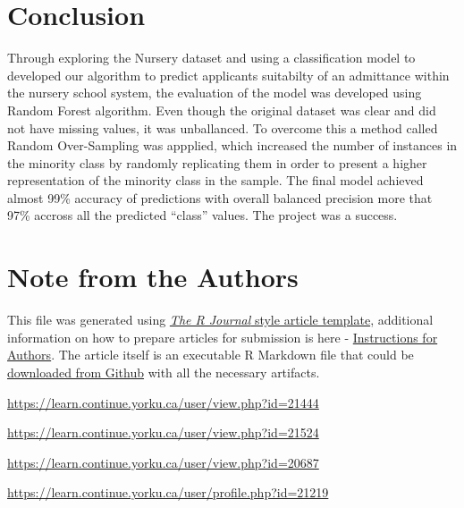 \newpage

\hypertarget{conclusion}{%
\section{Conclusion}\label{conclusion}}

Through exploring the Nursery dataset and using a classification model
to developed our algorithm to predict applicants suitabilty of an
admittance within the nursery school system, the evaluation of the model
was developed using Random Forest algorithm. Even though the original
dataset was clear and did not have missing values, it was unballanced.
To overcome this a method called Random Over-Sampling was appplied,
which increased the number of instances in the minority class by
randomly replicating them in order to present a higher representation of
the minority class in the sample. The final model achieved almost 99\%
accuracy of predictions with overall balanced precision more that 97\%
accross all the predicted ``class'' values. The project was a success.



\newpage

\hypertarget{note-from-the-authors}{%
\section{Note from the Authors}\label{note-from-the-authors}}

This file was generated using
\href{https://github.com/rstudio/rticles}{\emph{The R Journal} style
article template}, additional information on how to prepare articles for
submission is here -
\href{https://journal.r-project.org/share/author-guide.pdf}{Instructions
for Authors}. The article itself is an executable R Markdown file that
could be
\href{https://github.com/ivbsoftware/scda1010-lab1/tree/master/docs/R_Journal/csda1010-lab1lab1}{downloaded
from Github} with all the necessary artifacts.


\address{%
Viviane Adohouannon\\
York University School of Continuing Studies\\
\\
}
\url{https://learn.continue.yorku.ca/user/view.php?id=21444}

\address{%
Kate Alexander\\
York University School of Continuing Studies\\
\\
}
\url{https://learn.continue.yorku.ca/user/view.php?id=21524}

\address{%
Diana Azbel\\
York University School of Continuing Studies\\
\\
}
\url{https://learn.continue.yorku.ca/user/view.php?id=20687}

\address{%
Igor Baranov\\
York University School of Continuing Studies\\
\\
}
\url{https://learn.continue.yorku.ca/user/profile.php?id=21219}

